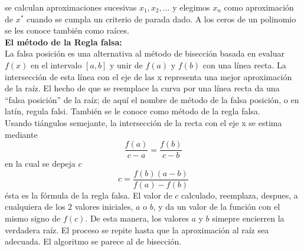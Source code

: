 \documentclass[12pt]{article}
\begin{document}
			se calculan aproximaciones sucesivas $ x_1,x_2,... $ y elegimos $ x_n $ como aproximación de $ x^* $ cuando se cumpla un 
			criterio de parada dado. A los ceros de un polinomio se les conoce también como raíces. \cite{bib:item3} \\
			\textbf{El método de la Regla falsa:}\\
			La falsa posición es una alternativa al método de bisección basada en evaluar $ f(x) $ en el 
			intervalo $ [a,b] $ y unir de $ f(a) $ y $ f(b) $ con una línea recta. La intersección de esta línea con 
			el eje de las x representa una mejor aproximación de la raíz. El hecho de que se reemplace la curva 
			por una línea recta da una “falsa posición” de la raíz; de aquí el nombre de método de la falsa 
			posición, o en latín, regula falsi. También se le conoce como método de la regla falsa.\\	
			Usando tiángulos semejante, la intersección de la recta con el eje x se estima mediante $$ \frac{f(a)}{c-a} = \frac{f(b)}{c-b} $$
			en la cual se depeja $ c $ $$ c = \frac{f(b)(a-b)}{f(a)-f(b)} $$ ésta es la fórmula de la regla falsa. El valor de $ c $ calculado, 
			reemplaza, despues, a cualquiera de los 2 valores iniciales, $ a $ o $ b $, y da un valor de la función con el mismo signo de $ f(c) $.
			De esta manera, los valores $ a $ y $ b $ simepre encierren la verdadera raíz. El proceso se repite hasta que la aproximación al raíz 
			sea adecuada. El algoritmo se parece al de bisección. \cite{bib:item4}
\end{document}
